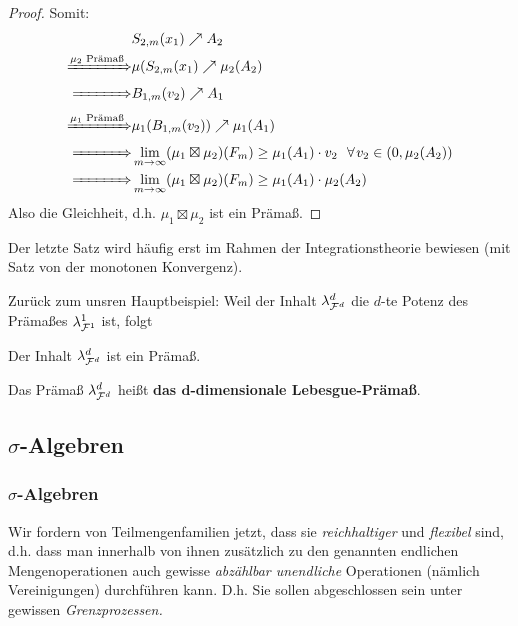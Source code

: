 \begin{satz}
\begin{proof}
Somit:
\begin{equation*}
	\begin{split}
				&	S_{2,m}(x_1) \nearrow A_2	\\
			\xRightarrow{\mu_2 \text{ Prämaß}} & \mu(S_{2,m}(x_1) \nearrow \mu_2(A_2) \\
			\xRightarrow{\quad \quad\quad\  \,} & B_{1,m}(v_2) \nearrow A_1 \\
			\xRightarrow{\mu_1 \text{ Prämaß}} & \mu_1 (B_{1,m}(v_2)) \nearrow \mu_1(A_1) \\
			\xRightarrow{\quad \quad\quad\  \,} & \lim_{m \to \infty} (\mu_1 \boxtimes \mu_2) (F_m) \geq \mu_1(A_1) \cdot v_2\ \  \forall v_2 \in (0,\mu_2(A_2)) \\
			\xRightarrow{\quad \quad\quad\  \,} & \lim_{m \to \infty} (\mu_1 \boxtimes \mu_2) (F_m) \geq \mu_1(A_1) \cdot \mu_2(A_2) \\
	\end{split}
\end{equation*}
Also die Gleichheit, d.h. $\mu_1 \boxtimes \mu_2$ ist ein Prämaß.
\end{proof}
\end{satz}

\begin{remark}
Der letzte Satz wird häufig erst im Rahmen der Integrationstheorie bewiesen (mit Satz von der monotonen Konvergenz).
\end{remark}

Zurück zum unsren Hauptbeispiel: Weil der Inhalt $\lambda^d_{\mathcal{F}^d}$ die $d$-te Potenz des Prämaßes $\lambda^1_{\mathcal{F}^1}$ ist, folgt

\begin{korollar}
Der Inhalt $\lambda^d_{\mathcal{F}^d}$ ist ein Prämaß.
\end{korollar}

\begin{definition}
	\begin{mdframed} 
		Das Prämaß $\lambda^d_{\mathcal{F}^d}$ heißt \textbf{das $\boldsymbol{d}$-dimensionale Lebesgue-Prämaß}.
	\end{mdframed}
\end{definition}

\subsection{$\sigma$-Algebren}
\subsubsection{$\sigma$-Algebren}
Wir fordern von Teilmengenfamilien jetzt, dass sie \emph{reichhaltiger} und \emph{flexibel} sind, d.h. dass man innerhalb von ihnen zusätzlich zu den genannten endlichen Mengenoperationen auch gewisse \emph{abzählbar unendliche} Operationen (nämlich Vereinigungen) durchführen kann. D.h. Sie sollen abgeschlossen sein unter gewissen \emph{Grenzprozessen.}

